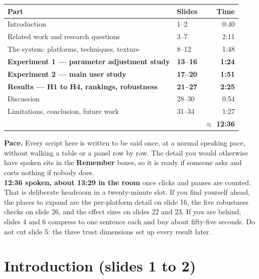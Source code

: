 \documentclass[11pt,a4paper]{article}
\begin{document}
\begin{center}
\begin{tabular}{@{}llr@{}}
\toprule
\textbf{Part} & \textbf{Slides} & \textbf{Time} \\
\midrule
Introduction & 1--2 & 0:40 \\
Related work and research questions & 3--7 & 2:11 \\
The system: platforms, techniques, texture & 8--12 & 1:48 \\
\textbf{Experiment 1 — parameter adjustment study} & \textbf{13--16} & \textbf{1:24} \\
\textbf{Experiment 2 — main user study} & \textbf{17--20} & \textbf{1:51} \\
\textbf{Results — H1 to H4, rankings, robustness} & \textbf{21--27} & \textbf{2:25} \\
Discussion & 28--30 & 0:54 \\
Limitations, conclusion, future work & 31--34 & 1:27 \\
\midrule
& & \textbf{$\approx$ 12:36} \\
\bottomrule
\end{tabular}
\end{center}

\vspace{0.5em}
\noindent\colorbox{knlight}{\parbox{0.972\textwidth}{\small\color{knblue}
\textbf{Pace.} Every script here is written to be said once, at a normal speaking pace, without walking a table or a panel row by row. The detail you would otherwise have spoken sits in the \textbf{Remember} boxes, so it is ready if someone asks and costs nothing if nobody does.\\[0.4em]
\textbf{12:36 spoken, about 13:29 in the room} once clicks and pauses are counted. That is deliberate headroom in a twenty-minute slot. If you find yourself ahead, the places to expand are the per-platform detail on slide 16, the five robustness checks on slide 26, and the effect sizes on slides 22 and 23. If you are behind, slides 4 and 6 compress to one sentence each and buy about fifty-five seconds. Do not cut slide 5: the three trust dimensions set up every result later.}}

\clearpage

\section*{\color{knblue}Introduction (slides 1 to 2)}
\end{document}
